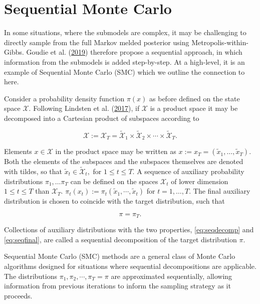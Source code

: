 \documentclass[11pt,]{book}
\begin{document}
\newpage

\section{Sequential Monte Carlo}\label{sequential-monte-carlo}

In some situations, where the submodels are complex, it may be
challenging to directly sample from the full Markov melded posterior
using Metropolis-within-Gibbs. Goudie et al.
(\protect\hyperlink{ref-goudie2019joining}{2019}) therefore propose a
sequential approach, in which information from the submodels is added
step-by-step. At a high-level, it is an example of Sequential Monte
Carlo (SMC) which we outline the connection to here.

Consider a probability density function \(\pi(x)\) as before defined on
the state space \(\mathcal{X}\). Following Lindsten et al.
(\protect\hyperlink{ref-lindsten2017divide}{2017}), if \(\mathcal{X}\)
is a product space it may be decomposed into a Cartesian product of
subspaces according to

\begin{equation}
\mathcal{X} := \mathcal{X}_T = \widetilde{\mathcal{X}}_1 \times \widetilde{\mathcal{X}}_2 \times \cdots \times \widetilde{\mathcal{X}}_T. \label{eq:seqdecomp}
\end{equation}

Elements \(x \in \mathcal{X}\) in the product space may be written as
\(x := x_T = (\widetilde{x}_1, \ldots, \widetilde{x}_T)\). Both the
elements of the subspaces and the subspaces themselves are denoted with
tildes, so that \(\widetilde{x}_t \in \widetilde{\mathcal{X}}_t,\) for
\(1 \leq t \leq T\). A sequence of auxiliary probability distributions
\(\pi_1, \ldots \pi_T\) can be defined on the spaces \(\mathcal{X}_t\)
of lower dimension \(1 \leq t \leq T\) than \(\mathcal{X}_T\).
\(\pi_t(x_t) := \pi_t(\widetilde{x}_1, \cdots, \widetilde{x}_t)\) for
\(t = 1, \ldots, T\). The final auxiliary distribution is chosen to
coincide with the target distribution, such that

\begin{equation}
\pi = \pi_T \label{eq:seqfinal}.
\end{equation}

Collections of auxiliary distributions with the two properties,
\eqref{eq:seqdecomp} and \eqref{eq:seqfinal}, are called a sequential
decomposition of the target distribution \(\pi\).

Sequential Monte Carlo (SMC) methods are a general class of Monte Carlo
algorithms designed for situations where sequential decompositions are
applicable. The distributions \(\pi_1, \pi_2, \cdots, \pi_T = \pi\) are
approximated sequentially, allowing information from previous iterations
to inform the sampling strategy as it proceeds.
\end{document}
